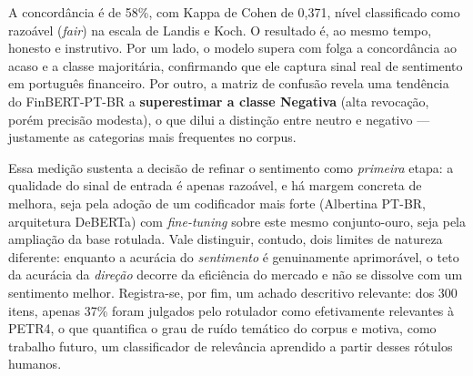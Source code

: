 A concordância é de 58\%, com Kappa de Cohen de
0,371, nível classificado como razoável (\textit{fair}) na escala de
Landis e Koch. O resultado é, ao mesmo tempo, honesto e instrutivo. Por um lado, o modelo supera com
folga a concordância ao acaso e a classe majoritária, confirmando que ele captura sinal real de
sentimento em português financeiro. Por outro, a matriz de confusão revela uma tendência do
\mbox{FinBERT-PT-BR} a \textbf{superestimar a classe Negativa} (alta revocação, porém precisão modesta),
o que dilui a distinção entre neutro e negativo --- justamente as categorias mais frequentes no corpus.

Essa medição sustenta a decisão de refinar o sentimento como \emph{primeira} etapa: a qualidade do
sinal de entrada é apenas razoável, e há margem concreta de melhora, seja pela adoção de um codificador
mais forte (Albertina \mbox{PT-BR}, arquitetura DeBERTa) com \textit{fine-tuning} sobre este mesmo
conjunto-ouro, seja pela ampliação da base rotulada. Vale distinguir, contudo, dois limites de natureza
diferente: enquanto a acurácia do \emph{sentimento} é genuinamente aprimorável, o teto da acurácia da
\emph{direção} decorre da eficiência do mercado e não se dissolve com um sentimento melhor. Registra-se,
por fim, um achado descritivo relevante: dos 300 itens, apenas
37\% foram julgados pelo rotulador como efetivamente
relevantes à PETR4, o que quantifica o grau de ruído temático do corpus e motiva, como trabalho futuro,
um classificador de relevância aprendido a partir desses rótulos humanos.
